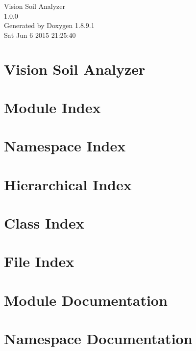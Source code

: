 \documentclass[twoside]{book}
\newcommand{\+}{\discretionary{\mbox{\scriptsize$\hookleftarrow$}}{}{}}
\newcommand{\clearemptydoublepage}{%
  \newpage{\pagestyle{empty}\cleardoublepage}%
}
\begin{document}
\hypersetup{pageanchor=false,
             bookmarks=true,
             bookmarksnumbered=true,
             pdfencoding=unicode
            }
\begin{titlepage}
\vspace*{7cm}
\begin{center}%
{\Large Vision Soil Analyzer \\[1ex]\large 1.\+0.\+0 }\\
\vspace*{1cm}
{\large Generated by Doxygen 1.8.9.1}\\
\vspace*{0.5cm}
{\small Sat Jun 6 2015 21:25:40}\\
\end{center}
\end{titlepage}
\clearemptydoublepage
\tableofcontents
\clearemptydoublepage
{}
\hypersetup{pageanchor=true}

\chapter{Vision Soil Analyzer}
\label{index}\hypertarget{index}{}
\chapter{Module Index}

\chapter{Namespace Index}

\chapter{Hierarchical Index}

\chapter{Class Index}

\chapter{File Index}

\chapter{Module Documentation}

\chapter{Namespace Documentation}












\end{document}
